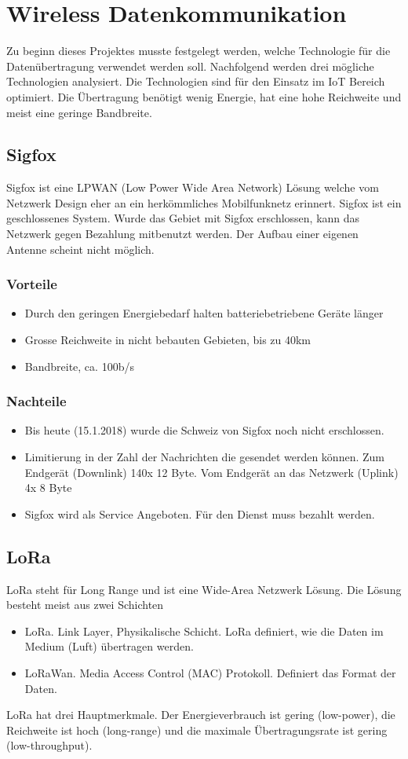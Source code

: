 \documentclass[11pt,english,german]{report}
\theoremstyle{definition}
\begin{document}
\section{Wireless Datenkommunikation}
Zu beginn dieses Projektes musste festgelegt werden, welche Technologie für die Datenübertragung verwendet werden soll. Nachfolgend werden drei mögliche Technologien analysiert. Die Technologien sind für den Einsatz im IoT Bereich optimiert. Die Übertragung benötigt wenig Energie, hat eine hohe Reichweite und meist eine geringe Bandbreite.

\subsection{Sigfox}
Sigfox ist eine \gls{LPWAN} (Low Power Wide Area Network) Lösung welche vom Netzwerk Design eher an ein herkömmliches Mobilfunknetz erinnert. Sigfox ist ein geschlossenes System. Wurde das Gebiet mit Sigfox erschlossen, kann das Netzwerk gegen Bezahlung mitbenutzt werden. Der Aufbau einer eigenen Antenne scheint nicht möglich. 

\subsubsection{Vorteile}
\begin{itemize}
	\item Durch den geringen Energiebedarf halten batteriebetriebene Geräte länger
	\item Grosse Reichweite in nicht bebauten Gebieten, bis zu 40km
	\item Bandbreite, ca. 100b/s
\end{itemize}
\subsubsection{Nachteile}
\begin{itemize}
	\item Bis heute (15.1.2018) wurde die Schweiz von Sigfox noch nicht erschlossen.
	\item Limitierung in der Zahl der Nachrichten die gesendet werden können. Zum Endgerät (Downlink) 140x 12 Byte. Vom Endgerät an das Netzwerk (Uplink) 4x 8 Byte
	\item Sigfox wird als Service Angeboten. Für den Dienst muss bezahlt werden.
\end{itemize}

\subsection{LoRa}
LoRa steht für Long Range und ist eine Wide-Area Netzwerk Lösung. Die Lösung besteht meist aus zwei Schichten
\begin{itemize}
	\item LoRa. Link Layer, Physikalische Schicht. LoRa definiert, wie die Daten im Medium (Luft) übertragen werden.
	\item LoRaWan. Media Access Control (MAC) Protokoll. Definiert das Format der Daten.
\end{itemize}
LoRa hat drei Hauptmerkmale. Der Energieverbrauch ist gering (low-power), die Reichweite ist hoch (long-range) und die maximale Übertragungsrate ist gering (low-throughput).
\end{document}
